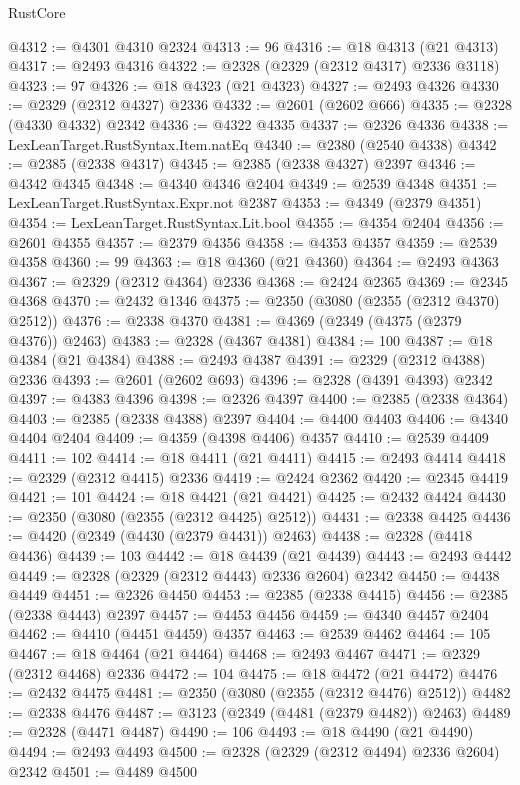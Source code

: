 \begin{lexlean}{RustCore}
\begin{coremodule}
@4312 := @4301 @4310 @2324
@4313 := 96
@4316 := @18 @4313 (@21 @4313)
@4317 := @2493 @4316
@4322 := @2328 (@2329 (@2312 @4317) @2336 @3118)
@4323 := 97
@4326 := @18 @4323 (@21 @4323)
@4327 := @2493 @4326
@4330 := @2329 (@2312 @4327) @2336
@4332 := @2601 (@2602 @666)
@4335 := @2328 (@4330 @4332) @2342
@4336 := @4322 @4335
@4337 := @2326 @4336
@4338 := LexLeanTarget.RustSyntax.Item.natEq
@4340 := @2380 (@2540 @4338)
@4342 := @2385 (@2338 @4317)
@4345 := @2385 (@2338 @4327) @2397
@4346 := @4342 @4345
@4348 := @4340 @4346 @2404
@4349 := @2539 @4348
@4351 := LexLeanTarget.RustSyntax.Expr.not @2387
@4353 := @4349 (@2379 @4351)
@4354 := LexLeanTarget.RustSyntax.Lit.bool
@4355 := @4354 @2404
@4356 := @2601 @4355
@4357 := @2379 @4356
@4358 := @4353 @4357
@4359 := @2539 @4358
@4360 := 99
@4363 := @18 @4360 (@21 @4360)
@4364 := @2493 @4363
@4367 := @2329 (@2312 @4364) @2336
@4368 := @2424 @2365
@4369 := @2345 @4368
@4370 := @2432 @1346
@4375 := @2350 (@3080 (@2355 (@2312 @4370) @2512))
@4376 := @2338 @4370
@4381 := @4369 (@2349 (@4375 (@2379 @4376)) @2463)
@4383 := @2328 (@4367 @4381)
@4384 := 100
@4387 := @18 @4384 (@21 @4384)
@4388 := @2493 @4387
@4391 := @2329 (@2312 @4388) @2336
@4393 := @2601 (@2602 @693)
@4396 := @2328 (@4391 @4393) @2342
@4397 := @4383 @4396
@4398 := @2326 @4397
@4400 := @2385 (@2338 @4364)
@4403 := @2385 (@2338 @4388) @2397
@4404 := @4400 @4403
@4406 := @4340 @4404 @2404
@4409 := @4359 (@4398 @4406) @4357
@4410 := @2539 @4409
@4411 := 102
@4414 := @18 @4411 (@21 @4411)
@4415 := @2493 @4414
@4418 := @2329 (@2312 @4415) @2336
@4419 := @2424 @2362
@4420 := @2345 @4419
@4421 := 101
@4424 := @18 @4421 (@21 @4421)
@4425 := @2432 @4424
@4430 := @2350 (@3080 (@2355 (@2312 @4425) @2512))
@4431 := @2338 @4425
@4436 := @4420 (@2349 (@4430 (@2379 @4431)) @2463)
@4438 := @2328 (@4418 @4436)
@4439 := 103
@4442 := @18 @4439 (@21 @4439)
@4443 := @2493 @4442
@4449 := @2328 (@2329 (@2312 @4443) @2336 @2604) @2342
@4450 := @4438 @4449
@4451 := @2326 @4450
@4453 := @2385 (@2338 @4415)
@4456 := @2385 (@2338 @4443) @2397
@4457 := @4453 @4456
@4459 := @4340 @4457 @2404
@4462 := @4410 (@4451 @4459) @4357
@4463 := @2539 @4462
@4464 := 105
@4467 := @18 @4464 (@21 @4464)
@4468 := @2493 @4467
@4471 := @2329 (@2312 @4468) @2336
@4472 := 104
@4475 := @18 @4472 (@21 @4472)
@4476 := @2432 @4475
@4481 := @2350 (@3080 (@2355 (@2312 @4476) @2512))
@4482 := @2338 @4476
@4487 := @3123 (@2349 (@4481 (@2379 @4482)) @2463)
@4489 := @2328 (@4471 @4487)
@4490 := 106
@4493 := @18 @4490 (@21 @4490)
@4494 := @2493 @4493
@4500 := @2328 (@2329 (@2312 @4494) @2336 @2604) @2342
@4501 := @4489 @4500

\end{coremodule}
\end{lexlean}
